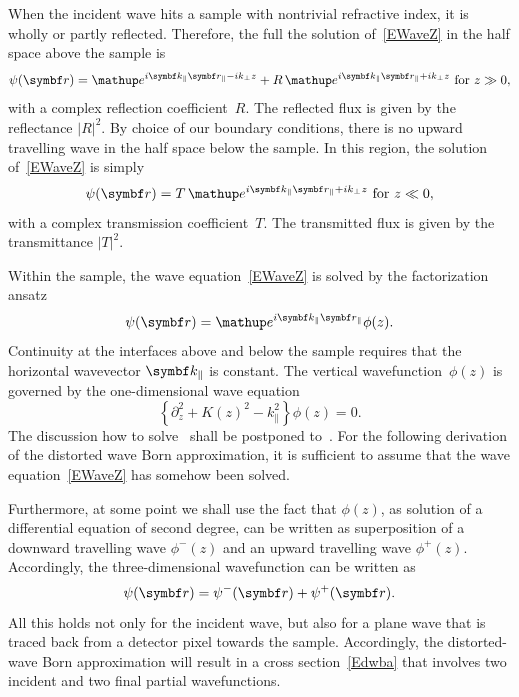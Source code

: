 When the incident wave hits a sample with nontrivial refractive index,
it is wholly or partly reflected.
Therefore, the full the solution of~\cref{EWaveZ} in the half space above the sample is
\begin{equation}
  \psi(\r) = \e^{i\k_\parallel\r_\parallel-ik_{\perp} z} +
      R\, \e^{i\k_\parallel\r_\parallel+ik_{\perp} z}
  \text{ for }z\gg0,
\end{equation}
with a complex reflection coefficient~$R$.
%
The reflected flux is given by the re\-flect\-an\-ce $|R|^2$.
%
%
By choice of our boundary conditions,
there is no upward travelling wave in the half space below the sample.
In this region, the solution of~\cref{EWaveZ} is simply
\begin{equation}
  \psi(\r) = T\, \e^{i\k_\parallel\r_\parallel+ik_{\perp} z}
  \text{ for }z\ll0,
\end{equation}
with a complex transmission coefficient~$T$.
The transmitted flux is given by the transmittance $|T|^2$.
%
%

Within the sample, the wave equation~\cref{EWaveZ}
is solved by the factorization ansatz
\begin{equation}\label{Ekpar}
\psi(\r) = \e^{i \k_\parallel\r_\parallel} \phi(z).
\end{equation}
%
Continuity at the interfaces above and below the sample
requires that the horizontal wavevector $\k_\parallel$ is constant.
The vertical wavefunction~$\phi(z)$
is governed by the one-dimensional wave equation
\begin{equation}\label{Ewavez}
\left\{\partial_z^2 + K(z)^2 - k_\parallel^2 \right\} \phi(z) = 0.
\end{equation}
The discussion how to solve~ shall be postponed to~.
For the following derivation of the distorted wave Born approximation,
it is sufficient to assume that the wave equation~\cref{EWaveZ}
has somehow been solved.

Furthermore, at some point we shall use the fact that $\phi(z)$,
as solution of a differential equation of second degree,
can be written as superposition
of a downward travelling wave $\phi^-(z)$
and an upward travelling wave $\phi^+(z)$.
Accordingly, the three-dimensional wavefunction can be written as
\begin{equation}
  \psi(\r) = \psi^-(\r)+\psi^+(\r).
\end{equation}
All this holds not only for the incident wave,
but also for a plane wave that is traced back from a detector pixel
towards the sample.
%
%
%
Accordingly,
the distorted-wave Born approximation will result in a cross section~\cref{Edwba}
that involves two incident and two final partial wavefunctions.

